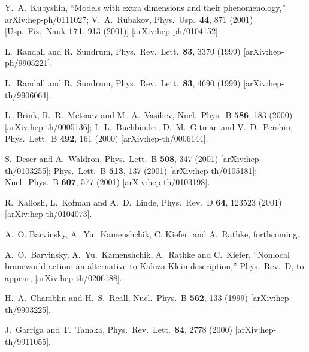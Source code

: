 \documentclass[a4paper,prl,twocolumn,amsmath,amssymb,showpacs]{revtex4}
\begin{document}
 
\begin{thebibliography}{99} 
 
Y.~A.~Kubyshin, 
``Models with extra dimensions and their phenomenology,'' 
arXiv:hep-ph/0111027; 
V.~A.~Rubakov, 
Phys.\ Usp.\  {\bf 44}, 871 (2001) 
[Usp.\ Fiz.\ Nauk {\bf 171}, 913 (2001)] 
[arXiv:hep-ph/0104152]. 
 
L.~Randall and R.~Sundrum, 
Phys.\ Rev.\ Lett.\  {\bf 83}, 3370 (1999) 
[arXiv:hep-ph/9905221]. 
 
L.~Randall and R.~Sundrum, 
Phys.\ Rev.\ Lett.\  {\bf 83}, 4690 (1999) 
[arXiv:hep-th/9906064]. 
 
L.~Brink, R.~R.~Metsaev and M.~A.~Vasiliev,
Nucl.\ Phys.\ B {\bf 586}, 183 (2000)
[arXiv:hep-th/0005136];
I.~L.~Buchbinder, D.~M.~Gitman and V.~D.~Pershin,
Phys.\ Lett.\ B {\bf 492}, 161 (2000) [arXiv:hep-th/0006144].

S.~Deser and A.~Waldron,
Phys.\ Lett.\ B {\bf 508}, 347 (2001)
[arXiv:hep-th/0103255];
Phys.\ Lett.\ B {\bf 513}, 137 (2001)
[arXiv:hep-th/0105181];
Nucl.\ Phys.\ B {\bf 607}, 577 (2001)
[arXiv:hep-th/0103198].
 
R.~Kallosh, L.~Kofman and A.~D.~Linde,  
Phys.\ Rev.\ D {\bf 64}, 123523 (2001)  
[arXiv:hep-th/0104073]. 
 
A.~O. Barvinsky, A.~Yu.~Kamenshchik, C. Kiefer, and A.~Rathke, 
forthcoming. 
 
A.~O.~Barvinsky, A.~Yu.~Kamenshchik, A.~Rathke and C.~Kiefer, 
``Nonlocal braneworld action: an alternative to Kaluza-Klein description,'' 
 Phys.\ Rev.\ D, to appear, [arXiv:hep-th/0206188]. 
 
H.~A.~Chamblin and H.~S.~Reall, 
Nucl.\ Phys.\ B {\bf 562}, 133 (1999) 
[arXiv:hep-th/9903225]. 
 
J.~Garriga and T.~Tanaka, 
Phys.\ Rev.\ Lett.\  {\bf 84}, 2778 (2000) 
[arXiv:hep-th/9911055]. 
 

\end{thebibliography}
\end{document}
